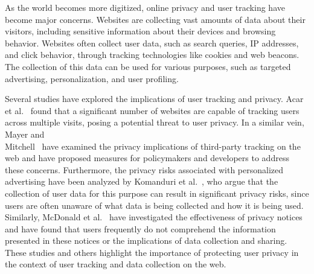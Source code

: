 
As the world becomes more digitized, online privacy and user tracking have become major concerns. Websites are collecting vast amounts of data about their visitors, including sensitive information about their devices and browsing behavior. Websites often collect user data, such as search queries, IP addresses, and click behavior, through tracking technologies like cookies and web beacons. The collection of this data can be used for various purposes, such as targeted advertising, personalization, and user profiling.
 
Several studies have explored the implications of user tracking and privacy. Acar et al.~ found that a significant number of websites are capable of tracking users across multiple visits, posing a potential threat to user privacy. In a similar vein, Mayer and \\ Mitchell~ have examined the privacy implications of third-party tracking on the web and have proposed measures for policymakers and developers to address these concerns.
Furthermore, the privacy risks associated with personalized advertising have been analyzed by Komanduri et al.~, who argue that the collection of user data for this purpose can result in significant privacy risks, since users are often unaware of what data is being collected and how it is being used. Similarly, McDonald et al.~ have investigated the effectiveness of privacy notices and have found that users frequently do not comprehend the information presented in these notices or the implications of data collection and sharing. These studies and others highlight the importance of protecting user privacy in the context of user tracking and data collection on the web.

